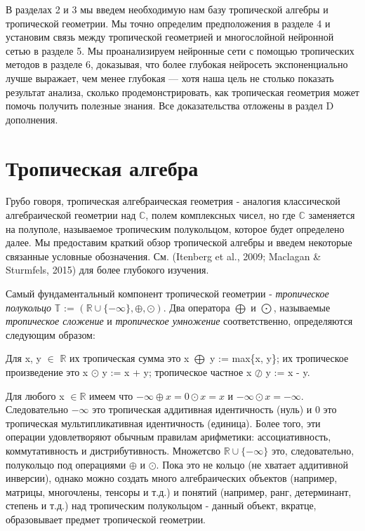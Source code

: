 \documentclass[russian]{lecture-notes}
\begin{document}
	В разделах 2 и 3 мы введем необходимую нам базу тропической алгебры и тропической геометрии. Мы точно определим предположения в разделе 4 и установим связь между тропической геометрией и многослойной нейронной сетью в разделе 5. Мы проанализируем нейронные сети с помощью тропических методов в разделе 6, доказывая, что более глубокая нейросеть экспоненциально лучше выражает, чем менее глубокая --- хотя наша цель не столько показать результат анализа, сколько продемонстрировать, как тропическая геометрия может помочь получить полезные знания. Все доказательства отложены в раздел D дополнения.
	
	\section{Тропическая алгебра}
	
	Грубо говоря, тропическая алгебраическая геометрия - аналогия классической алгебраической геометрии над $\mathbb{C}$, полем комплексных чисел, но где $\mathbb{C}$ заменяется на полуполе, называемое тропическим полукольцом, которое будет определено далее. Мы предоставим краткий обзор тропической алгебры и введем некоторые связанные условные обозначения. См. (Itenberg et al., 2009; Maclagan \& Sturmfels,
	2015) для более глубокого изучения.
	
	Самый фундаментальный компонент тропической геометрии - \textit{тропическое полукольцо} $\mathbb{T}$ := $ (\mathbb{R} \cup \{- \infty \}, \oplus, \odot)$. Два оператора $\bigoplus$ и $\bigodot$, называемые \textit{тропическое сложение} и \textit{тропическое умножение} соответственно, определяются следующим образом:
	
	\begin{Definition}
		Для x, y $\in $ $ \mathbb{R}$ их тропическая сумма это x $\bigoplus$ y := max\{x, y\}; их тропическое произведение это x $\odot$ y := x + y; тропическое частное x $\oslash$ y := x - y.
	\end{Definition}
	
	Для любого x $\in \mathbb{R}$ имеем что $- \infty \oplus x = 0 \odot x = x$ и $- \infty \odot x = - \infty $. Следовательно $ - \infty$ это тропическая аддитивная идентичность (нуль) и 0 это тропическая мультипликативная идентичность (единица). Более того, эти операции удовлетворяют обычным правилам арифметики: ассоциативность, коммутативность и дистрибутивность. Множетсво $ \mathbb{R} \cup \{ - \infty\} $ это, следовательно, полукольцо под операциями $\oplus$ и $\odot$. Пока это не кольцо (не хватает аддитивной инверсии), однако можно создать много алгебраических объектов (например, матрицы, многочлены, тенсоры и т.д.) и понятий (например, ранг, детерминант, степень и т.д.) над тропическим полукольцом - данный объект, вкратце, образовывает предмет тропической геометрии.
	
\end{document}
